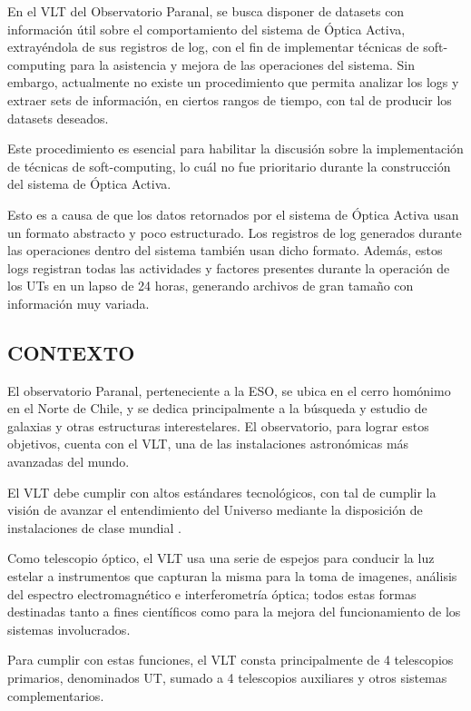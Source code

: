 
En el VLT del Observatorio Paranal, se busca disponer de datasets con información útil sobre el comportamiento del sistema de Óptica Activa, extrayéndola de sus registros de log, con el fin de implementar técnicas de soft-computing para la asistencia y mejora de las operaciones del sistema. Sin embargo, actualmente no existe un procedimiento que permita analizar los logs y extraer sets de información, en ciertos rangos de tiempo, con tal de producir los datasets deseados. 

Este procedimiento es esencial para habilitar la discusión sobre la implementación de técnicas de soft-computing, lo cuál no fue prioritario durante la construcción del sistema de Óptica Activa.

Esto es a causa de que los datos retornados por el sistema de Óptica Activa usan un formato abstracto y poco estructurado. Los registros de log generados durante las operaciones dentro del sistema también usan dicho formato. Además, estos logs registran todas las actividades y factores presentes durante la operación de los UTs en un lapso de 24 horas, generando archivos de gran tamaño con información muy variada.

\subsection{CONTEXTO}

El observatorio Paranal, perteneciente a la ESO, se ubica en el cerro homónimo en el Norte de Chile, y se dedica principalmente a la búsqueda y estudio de galaxias y otras estructuras interestelares. El observatorio, para lograr estos objetivos, cuenta con el VLT, una de las instalaciones astronómicas más avanzadas del mundo\cite{eso1998vlt}.

El VLT debe cumplir con altos estándares tecnológicos, con tal de cumplir la visión de avanzar el entendimiento del Universo mediante la disposición de instalaciones de clase mundial \cite{eso1998vlt}.

Como telescopio óptico, el VLT usa una serie de espejos para conducir la luz estelar a instrumentos que capturan la misma para la toma de imagenes, análisis del espectro electromagnético e interferometría óptica; todos estas formas destinadas tanto a fines científicos como para la mejora del funcionamiento de los sistemas involucrados\cite{eso1998vlt}.

Para cumplir con estas funciones, el VLT consta principalmente de 4 telescopios primarios, denominados UT, sumado a 4 telescopios auxiliares y otros sistemas complementarios\cite{eso1998vlt}.


